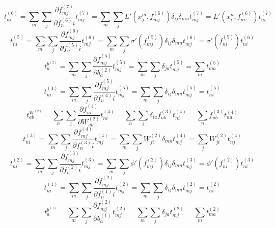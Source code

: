 \documentclass[fleqn]{article}
\begin{document}
\begin{equation}
    t^{(6)}_{ni} = \sum_m \sum_j \frac{\partial f^{(7)}_{mj}}{\partial f^{(6)}_ni} t^{(7)}_{mj} = \sum_m \sum_j L'\left(x^m_j, f^{(6)}_{mj}\right) \delta_{ij} \delta_{mn} t^{(7)}_{mj} = L'\left(x^n_i, f^{(6)}_{ni}\right) t^{(7)}_{ni}
\end{equation}
\begin{equation}
    t^{(5)}_{ni} = \sum_m \sum_j \frac{\partial f^{(6)}_{mj}}{\partial f^{(5)}_ni} t^{(6)}_{mj} = \sum_m \sum_j \sigma'\left(f^{(5)}_{mj}\right) \delta_{ij} \delta_{mn} t^{(6)}_{mj} = \sigma'\left(f^{(5)}_{ni}\right) t^{(6)}_{ni}
\end{equation}
\begin{equation}
    t^{b^{(2)}}_{a} = \sum_m \sum_j \frac{\partial f^{(5)}_{mj}}{\partial b^{(2)}_a} t^{(5)}_{mj} = \sum_m \sum_j \delta_{ja} t^{(5)}_{mj} = \sum_m t^{(5)}_{ma}
\end{equation}
\begin{equation}
    t^{(4)}_{ni} = \sum_m \sum_j \frac{\partial f^{(5)}_{mj}}{\partial f^{(4)}_ni} t^{(5)}_{mj} = \sum_m \sum_j \delta_{ij} \delta_{mn} t^{(5)}_{mj} = t^{(5)}_{ni}
\end{equation}
\begin{equation}
    t^{W^{(2)}}_{ab} = \sum_n \sum_i \frac{\partial f^{(4)}_{ni}}{\partial W^{(2)}_{ab}} t^{(4)}_{ni} = \sum_n \sum_i \delta_{ia} f^{(3)}_{nb} t^{(4)}_{ni} = \sum_n f^{(3)}_{nb} t^{(4)}_{na}
\end{equation}
\begin{equation}
    t^{(3)}_{ni} = \sum_m \sum_j \frac{\partial f^{(4)}_{mj}}{\partial f^{(3)}_ni} t^{(4)}_{mj} = \sum_m \sum_j W^{(2)}_{ji} \delta_{mn} t^{(4)}_{mj} = \sum_j W^{(2)}_{ji} t^{(4)}_{nj}
\end{equation}
\begin{equation}
    t^{(2)}_{ni} = \sum_m \sum_j \frac{\partial f^{(3)}_{mj}}{\partial f^{(2)}_ni} t^{(3)}_{mj} = \sum_m \sum_j \phi ' \left (f^{(2)}_{mj}\right) \delta_{ij} \delta_{mn} t^{(3)}_{mj} = \phi ' \left (f^{(2)}_{ni}\right) t^{(3)}_{ni}
\end{equation}
\begin{equation}
    t^{(1)}_{ni} = \sum_m \sum_j \frac{\partial f^{(2)}_{mj}}{\partial f^{(1)}_ni} t^{(2)}_{mj} = \sum_m \sum_j \delta_{ij} \delta_{mn} t^{(2)}_{mj} = t^{(2)}_{ni}
\end{equation}
\begin{equation}
    t^{b^{(1)}}_{a} = \sum_m \sum_j \frac{\partial f^{(2)}_{mj}}{\partial b^{(1)}_a} t^{(2)}_{mj} = \sum_m \sum_j \delta_{ja} t^{(2)}_{mj} = \sum_m t^{(2)}_{ma}
\end{equation}
\end{document}
